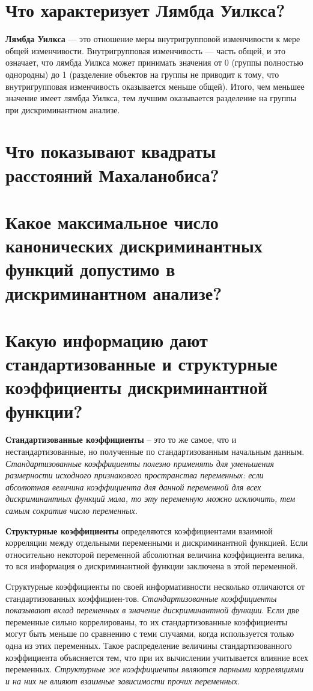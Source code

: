 \documentclass[a4paper, 12pt]{article}
\begin{document}
\section{Что характеризует Лямбда Уилкса?}
\textbf{Лямбда Уилкса} — это отношение меры внутригрупповой изменчивости к мере общей изменчивости. Внутригрупповая изменчивость — часть общей, и это означает, что лямбда Уилкса может принимать значения от 0 (группы полностью однородны) до 1 (разделение объектов на группы не приводит к тому, что внутригрупповая изменчивость оказывается меньше общей). Итого, чем меньшее значение имеет лямбда Уилкса, тем лучшим оказывается разделение на группы при дискриминантном анализе.

\section{Что показывают квадраты расстояний Махаланобиса?}
\section{Какое максимальное число канонических дискриминантных функций допустимо в дискриминантном анализе?}
\section{Какую информацию дают стандартизованные и структурные коэффициенты дискриминантной функции?}
 \textbf{Стандартизованные коэффициенты}  -- это то же самое, что и нестандартизованные, но полученные по стандартизованным начальным данным. \textit{Стандартизованные коэффициенты полезно применять для уменьшения размерности исходного признакового пространства переменных: если абсолютная величина коэффициента для данной переменной для всех дискриминантных функций мала, то эту переменную можно исключить, тем самым сократив число переменных.} 

\textbf{Структурные коэффициенты}  определяются коэффициентами взаимной корреляции между отдельными переменными и дискриминантной функцией. Если относительно некоторой переменной абсолютная величина коэффициента велика, то вся информация о дискриминантной функции заключена в этой переменной. 

Структурные коэффициенты по своей информативности несколько отличаются от стандартизованных коэффициен-тов. \textit{Стандартизованные коэффициенты показывают вклад переменных в значение дискриминантной функции}. Если две переменные сильно коррелированы, то их стандартизованные коэффициенты могут быть меньше по сравнению с теми случаями, когда используется только одна из этих переменных. Такое распределение величины стандартизованного коэффициента объясняется тем, что при их вычислении учитывается влияние всех переменных. \textit{Структурные же коэффициенты являются парными корреляциями и на них не влияют взаимные зависимости прочих переменных}.
\end{document}
